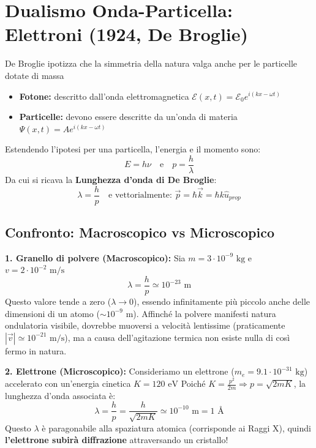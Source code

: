 \documentclass[11pt, a4paper]{article}
\begin{document}
\section{Dualismo Onda-Particella: Elettroni (1924, De Broglie)} %

De Broglie ipotizza che la simmetria della natura valga anche per le particelle dotate di massa %
\begin{itemize}
    \item \textbf{Fotone:} descritto dall'onda elettromagnetica $\mathcal{E}(x,t) = \mathcal{E}_0 e^{i(kx - \omega t)}$ %
    \item \textbf{Particelle:} devono essere descritte da un'onda di materia $\Psi(x,t) = A e^{i(kx - \omega t)}$ %
\end{itemize}

Estendendo l'ipotesi per una particella, l'energia e il momento sono: %
\begin{equation*}
    E = h\nu \quad \text{e} \quad p = \frac{h}{\lambda} %
\end{equation*}
Da cui si ricava la \textbf{Lunghezza d'onda di De Broglie}: %
\begin{equation}
    \boxed{ \lambda = \frac{h}{p} } \quad \text{e vettorialmente: } \vec{p} = \hbar \vec{k} = \hbar k \hat{u}_{prop} %
\end{equation}

\subsection{Confronto: Macroscopico vs Microscopico} %

\textbf{1. Granello di polvere (Macroscopico):} %
Sia $m = 3 \cdot 10^{-9} \text{ kg}$ e $v = 2 \cdot 10^{-2} \text{ m/s}$ %
\begin{equation*}
    \lambda = \frac{h}{p} \simeq 10^{-23} \text{ m} %
\end{equation*}
Questo valore tende a zero ($\lambda \to 0$), essendo infinitamente più piccolo anche delle dimensioni di un atomo ($\sim 10^{-9} \text{ m}$). Affinché la polvere manifesti natura ondulatoria visibile, dovrebbe muoversi a velocità lentissime (praticamente $|\vec{v}| \simeq 10^{-21} \text{ m/s}$), ma a causa dell'agitazione termica non esiste nulla di così fermo in natura.

\noindent
\textbf{2. Elettrone (Microscopico):} %
Consideriamo un elettrone ($m_e = 9.1 \cdot 10^{-31} \text{ kg}$) accelerato con un'energia cinetica $K = 120 \text{ eV}$ %
Poiché $K = \frac{p^2}{2m} \Rightarrow p = \sqrt{2mK}$, la lunghezza d'onda associata è: %
\begin{equation*}
    \lambda = \frac{h}{p} = \frac{h}{\sqrt{2mK}} \simeq 10^{-10} \text{ m} = 1 \text{ \AA} %
\end{equation*}
Questo $\lambda$ è paragonabile alla spaziatura atomica (corrisponde ai Raggi X), quindi \textbf{l'elettrone subirà diffrazione} attraversando un cristallo! %
\end{document}
